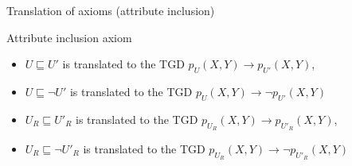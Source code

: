 \documentclass{beamer}
\begin{document}
 
 
 \begin{frame}{Translation of axioms (attribute  inclusion)}
  
  
  \begin{block}{Attribute inclusion axiom}
  \begin{itemize}
  \tiny
 \item  $U \sqsubseteq U'$  is translated to the TGD  $p_U(X,Y) \rightarrow p_{U'} (X,Y)$,
 \item   $U \sqsubseteq \neg U'$ is  translated to the TGD $p_U(X,Y) \rightarrow \neg p_{U'} (X,Y)$
  \item  $U_R \sqsubseteq U'_R$  is translated to the TGD  $p_{U_R}(X,Y) \rightarrow p_{U'_R} (X,Y)$,
 \item   $U_R \sqsubseteq \neg U'_R$ is  translated to the TGD $p_{U_R}(X,Y) \rightarrow \neg p_{U'_R} (X,Y)$
 \end{itemize}
  \end{block}
  
   \end{frame}
 
 
 
\end{document}
